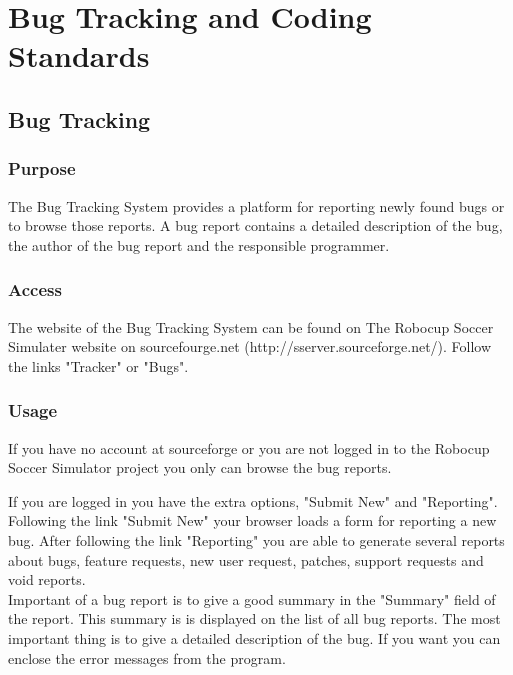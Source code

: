 
\chapter{Bug Tracking and Coding Standards}


\section{Bug Tracking}

\subsection{Purpose}

The Bug Tracking System provides a platform for reporting newly found bugs or to
browse those reports. A bug report contains a detailed description of the bug, 
the author of the bug report and the responsible programmer.

\subsection{Access}

The website of the Bug Tracking System can be found on 
The Robocup Soccer Simulater website on sourcefourge.net 
(http://sserver.sourceforge.net/). Follow the links "Tracker" or "Bugs".

\subsection{Usage}

If you have no account at sourceforge or you are not logged in 
to the Robocup Soccer Simulator project
you only can browse the bug reports.

If you are logged in you have the extra options, "Submit New" and "Reporting".
Following the link "Submit New" your browser loads a form for reporting a new bug.
After following the link "Reporting" you are able to generate several reports about
bugs, feature requests, new user request, patches, support requests and void reports.\\

Important of a bug report is to give a good summary in the "Summary" field of the report.
This summary is is displayed on the list of all bug reports.
The most important thing is to give a detailed description of the bug. If you want you can enclose 
the error messages from the program.

